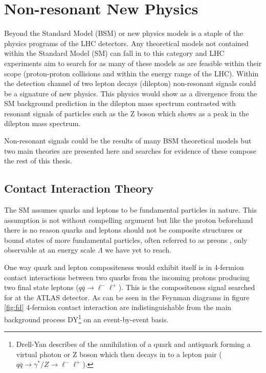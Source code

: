 


\section{Non-resonant New Physics}

    Beyond the Standard Model (BSM) or new physics models is a staple of the physics programs of the LHC detectors. Any theoretical models not contained within the Standard Model (SM) can fall in to this category and LHC experiments aim to search for as many of these models as are feasible within their scope (proton-proton collisions and within the energy range of the LHC). Within the detection channel of two lepton decays (dilepton) non-resonant signals could be a signature of new physics. This physics would show as a divergence from the SM background prediction in the dilepton mass spectrum contrasted with resonant signals of particles such as the Z boson which shows as a peak in the dilepton mass spectrum.

    Non-resonant signals could be the results of many BSM theoretical models but two main theories are presented here and searches for evidence of these compose the rest of this thesis.


    \subsection{Contact Interaction Theory}
        \label{sec:CItheory}

        The SM assumes quarks and leptons to be fundamental particles in nature. This assumption is not without compelling argument but like the proton beforehand there is no reason quarks and leptons should not be composite structures or bound states of more fundamental particles, often referred to as preons \cite{Eichten:1983hw}, only observable at an energy scale $\Lambda$ we have yet to reach. 

        One way quark and lepton compositeness would exhibit itself is in 4-fermion contact interactions between two quarks from the incoming protons producing two final state leptons ($q\bar{q} \rightarrow \ell^{-}\ell^{+}$). This is the compositeness signal searched for at the ATLAS detector. As can be seen in the Feynman diagrams in figure \ref{fig:fd} 4-fermion contact interaction are indistinguishable from the main background process DY\footnote{Drell-Yan describes of the annihilation of a quark and antiquark forming a virtual photon or Z boson which then decays in to a lepton pair ($q\bar{q} \rightarrow \gamma^{*}/Z \rightarrow \ell^{-}\ell^{+}$).} on an event-by-event basis.

